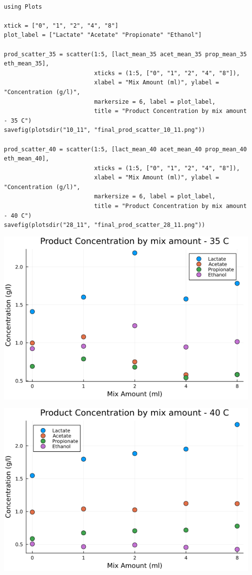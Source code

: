 \documentclass[11pt]{article}
\begin{document}
\begin{verbatim}

using Plots

xtick = ["0", "1", "2", "4", "8"]
plot_label = ["Lactate" "Acetate" "Propionate" "Ethanol"]

prod_scatter_35 = scatter(1:5, [lact_mean_35 acet_mean_35 prop_mean_35 eth_mean_35],
                          xticks = (1:5, ["0", "1", "2", "4", "8"]),
                          xlabel = "Mix Amount (ml)", ylabel = "Concentration (g/l)",
                          markersize = 6, label = plot_label,
                          title = "Product Concentration by mix amount - 35 C")
savefig(plotsdir("10_11", "final_prod_scatter_10_11.png"))

prod_scatter_40 = scatter(1:5, [lact_mean_40 acet_mean_40 prop_mean_40 eth_mean_40],
                          xticks = (1:5, ["0", "1", "2", "4", "8"]),
                          xlabel = "Mix Amount (ml)", ylabel = "Concentration (g/l)",
                          markersize = 6, label = plot_label,
                          title = "Product Concentration by mix amount - 40 C")
savefig(plotsdir("28_11", "final_prod_scatter_28_11.png"))

\end{verbatim}

\begin{center}
\includegraphics[width=.9\linewidth]{../plots/10_11/final_prod_scatter_10_11.png}
\end{center}

\begin{center}
\includegraphics[width=.9\linewidth]{../plots/28_11/final_prod_scatter_28_11.png}
\end{center}
\end{document}
